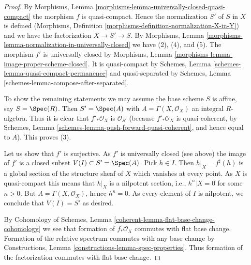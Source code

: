 \begin{proof}
By Morphisms, Lemma \ref{morphisms-lemma-universally-closed-quasi-compact}
the morphism $f$ is quasi-compact. Hence the normalization $S'$ of $S$ in
$X$ is defined (Morphisms, Definition
\ref{morphisms-definition-normalization-X-in-Y})
and we have the factorization $X \to S' \to S$. By
Morphisms, Lemma \ref{morphisms-lemma-normalization-in-universally-closed}
we have (2), (4), and (5). The morphism $f'$ is universally closed by
Morphisms, Lemma \ref{morphisms-lemma-image-proper-scheme-closed}.
It is quasi-compact by
Schemes, Lemma \ref{schemes-lemma-quasi-compact-permanence}
and quasi-separated by
Schemes, Lemma \ref{schemes-lemma-compose-after-separated}.

\medskip\noindent
To show the remaining statements we may assume the base scheme $S$ is affine,
say $S = \Spec(R)$. Then $S' = \Spec(A)$ with
$A = \Gamma(X, \mathcal{O}_X)$ an integral $R$-algebra.
Thus it is clear that $f'_*\mathcal{O}_X$
is $\mathcal{O}_{S'}$ (because $f'_*\mathcal{O}_X$ is quasi-coherent,
by
Schemes, Lemma
\ref{schemes-lemma-push-forward-quasi-coherent},
and hence equal to $\widetilde{A}$). This proves (3).

\medskip\noindent
Let us show that $f'$ is surjective. As $f'$ is universally closed (see above)
the image of $f'$ is a closed subset
$V(I) \subset S' = \Spec(A)$. Pick $h \in I$. Then
$h|_X = f^\sharp(h)$ is a global section of the structure sheaf of
$X$ which vanishes at every point. As $X$ is quasi-compact this means
that $h|_X$ is a nilpotent section, i.e., $h^n|X = 0$ for some $n > 0$.
But $A = \Gamma(X, \mathcal{O}_X)$, hence $h^n = 0$.
As every element of $I$ is nilpotent, we conclude that $V(I) = S'$ as desired.

\medskip\noindent
By Cohomology of Schemes, Lemma \ref{coherent-lemma-flat-base-change-cohomology}
we see that formation of $f_*\mathcal{O}_X$ commutes with flat base change.
Formation of the relative spectrum commutes with any base change by
Constructions, Lemma \ref{constructions-lemma-spec-properties}.
Thus formation of the factorization commutes with flat base change.
\end{proof}